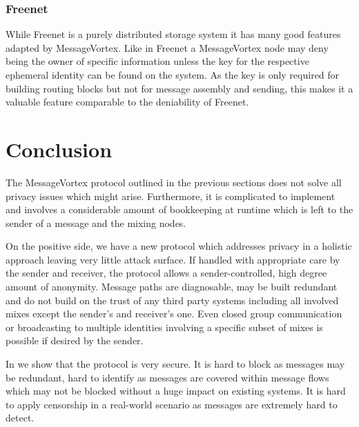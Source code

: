 \documentclass[runningheads]{llncs}
\begin{document}
\subsubsection{Freenet}
%
While Freenet is a purely distributed storage system it has many good features adapted by MessageVortex. Like in Freenet a MessageVortex node may deny being the owner of specific information unless the key for the respective ephemeral identity can be found on the system. As the key is only required for building routing blocks but not for message assembly and sending, this makes it a valuable feature comparable to the deniability of Freenet.

\section{Conclusion}
The MessageVortex protocol outlined in the previous sections does not solve all privacy issues which might arise. Furthermore, it is complicated to implement and involves a considerable amount of bookkeeping at runtime which is left to the sender of a message and the mixing nodes. 

On the positive side, we have a new protocol which addresses privacy in a holistic approach leaving very little attack surface. If handled with appropriate care by the sender and receiver, the protocol allows a sender-controlled, high degree amount of anonymity. Message paths are diagnosable, may be built redundant and do not build on the trust of any third party systems including all involved mixes except the sender's and receiver's one. Even closed group communication or broadcasting to multiple identities involving a specific subset of mixes is possible if desired by the sender.

In \cite{messageVortex} we show that the protocol is very secure. It is hard to block as messages may be redundant, hard to identify as messages are covered within message flows which may not be blocked without a huge impact on existing systems. It is hard to apply censorship in a real-world scenario as messages are extremely hard to detect. 
\end{document}
